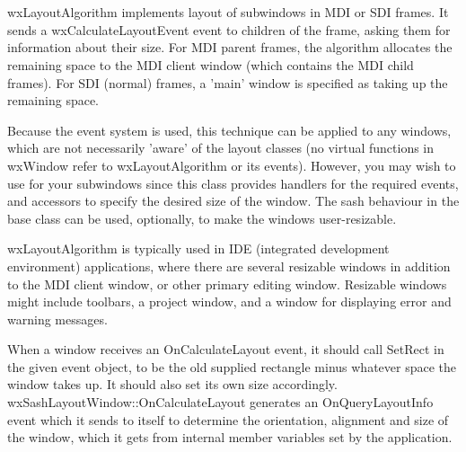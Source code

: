 \section{}\label{wxlayoutalgorithm}

wxLayoutAlgorithm implements layout of subwindows in MDI or SDI frames.
It sends a wxCalculateLayoutEvent event
to children of the frame, asking them for information about
their size. For MDI parent frames, the algorithm allocates
the remaining space to the MDI client window (which contains the MDI child frames).
For SDI (normal) frames, a 'main' window is specified as taking up the
remaining space.

Because the event system is used, this technique can be applied to any windows,
which are not necessarily 'aware' of the layout classes (no virtual functions
in wxWindow refer to wxLayoutAlgorithm or its events). However, you
may wish to use  for your subwindows
since this class provides handlers for the required events, and accessors
to specify the desired size of the window. The sash behaviour in the base class
can be used, optionally, to make the windows user-resizable.

wxLayoutAlgorithm is typically used in IDE (integrated development environment) applications,
where there are several resizable windows in addition to the MDI client window, or
other primary editing window. Resizable windows might include toolbars, a project
window, and a window for displaying error and warning messages.

When a window receives an OnCalculateLayout event, it should call SetRect in
the given event object, to be the old supplied rectangle minus whatever space the
window takes up. It should also set its own size accordingly.
wxSashLayoutWindow::OnCalculateLayout generates an OnQueryLayoutInfo event
which it sends to itself to determine the orientation, alignment and size of the window,
which it gets from internal member variables set by the application.

